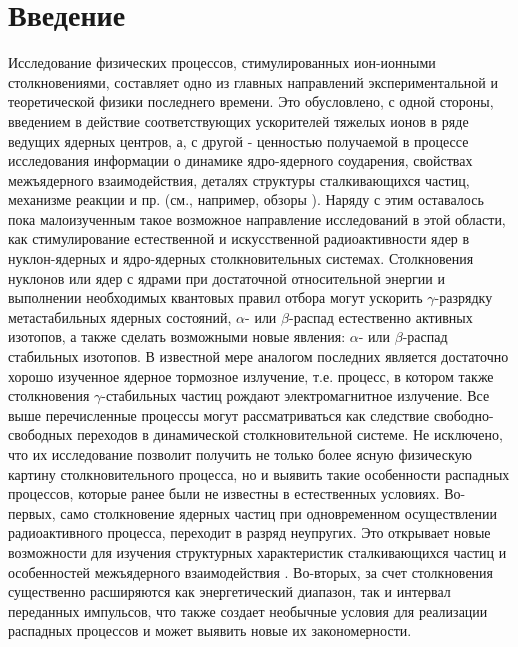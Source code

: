 
\chapter*{Введение}
 \label{intro}




Исследование физических процессов, стимулированных ион-ионными столкновениями, составляет одно из главных направлений
экспериментальной и теоретической физики последнего времени. Это обусловлено, с одной стороны, введением в действие
соответствующих ускорителей тяжелых ионов в ряде ведущих ядерных центров, а, с другой - ценностью получаемой в процессе
исследования информации о динамике ядро-ядерного соударения, свойствах межъядерного взаимодействия,  деталях структуры
сталкивающихся частиц, механизме реакции и пр. (см., например, обзоры \cite{braun, batkinech}). Наряду с этим оставалось
пока малоизученным такое возможное направление исследований в этой области, как стимулирование естественной и
искусственной радиоактивности ядер в нуклон-ядерных и ядро-ядерных столкновительных системах. Столкновения нуклонов  или
ядер с ядрами при достаточной относительной энергии и выполнении необходимых квантовых правил отбора могут ускорить
$\gamma$-разрядку метастабильных ядерных состояний, $\alpha$- или $\beta$-распад естественно активных изотопов, а также
сделать возможными новые явления:
$\alpha$- или $\beta$-распад стабильных изотопов.
В известной мере аналогом последних является достаточно хорошо изученное
ядерное тормозное излучение, т.е. процесс, в котором также столкновения
$\gamma$-стабильных частиц рождают электромагнитное излучение.
Все выше перечисленные процессы могут рассматриваться как следствие свободно-свободных переходов в динамической
столкновительной системе. Не исключено, что их исследование позволит получить не только более ясную физическую картину
столкновительного процесса, но и выявить такие особенности распадных процессов, которые ранее были не известны в
естественных условиях. Во-первых, само столкновение ядерных частиц при одновременном осуществлении радиоактивного
процесса, переходит в разряд неупругих. Это открывает новые возможности для изучения структурных характеристик
сталкивающихся частиц и особенностей межъядерного взаимодействия \cite{minin,huskivadze}. Во-вторых, за счет столкновения
существенно расширяются как энергетический диапазон, так и интервал переданных импульсов, что также создает необычные
условия для реализации распадных процессов и может выявить новые их закономерности.


